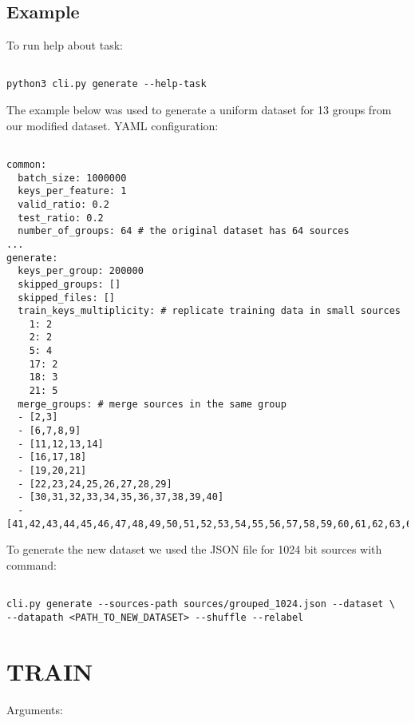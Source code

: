 \subsection*{Example}

To run help about task:

\begin{verbatim}

python3 cli.py generate --help-task

\end{verbatim}

\noindent
The example below was used to generate a uniform dataset for 13 groups from our modified dataset. YAML configuration:

\begin{verbatim}

common:
  batch_size: 1000000
  keys_per_feature: 1
  valid_ratio: 0.2
  test_ratio: 0.2
  number_of_groups: 64 # the original dataset has 64 sources
...  
generate:
  keys_per_group: 200000
  skipped_groups: []
  skipped_files: []
  train_keys_multiplicity: # replicate training data in small sources
    1: 2
    2: 2
    5: 4
    17: 2
    18: 3
    21: 5
  merge_groups: # merge sources in the same group
  - [2,3]
  - [6,7,8,9]
  - [11,12,13,14]
  - [16,17,18]
  - [19,20,21]
  - [22,23,24,25,26,27,28,29]
  - [30,31,32,33,34,35,36,37,38,39,40]
  - [41,42,43,44,45,46,47,48,49,50,51,52,53,54,55,56,57,58,59,60,61,62,63,64]
\end{verbatim}

\noindent
To generate the new dataset we used the JSON file for 1024 bit sources with command:

\begin{verbatim}

cli.py generate --sources-path sources/grouped_1024.json --dataset \
--datapath <PATH_TO_NEW_DATASET> --shuffle --relabel 

\end{verbatim}

\section{TRAIN}

\noindent
Arguments:

